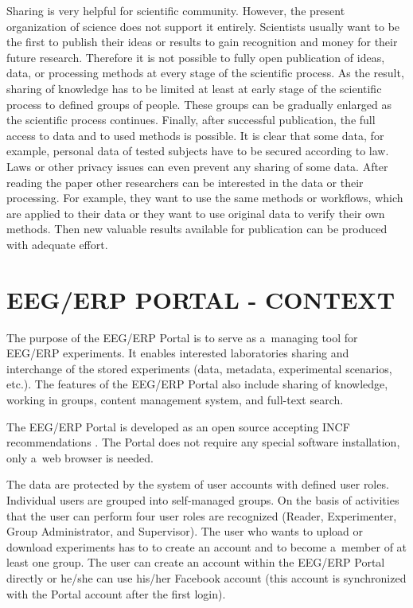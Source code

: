 \documentclass[a4paper,twoside]{article}
\begin{document}
Sharing is very helpful for scientific community.  However, the present organization of science does not support it entirely. Scientists usually want to be the first to publish their ideas or results to gain recognition and money for their future research. Therefore it is not possible to fully open publication of ideas, data, or processing methods at every stage of the scientific process. As the result, sharing of knowledge has to be limited at least at early stage of the scientific process to defined groups of people. These groups can be gradually enlarged as the scientific process continues. Finally, after successful publication, the full access to data and to used methods is possible. It is clear that some data, for example, personal data of tested subjects have to be secured according to law. Laws or other privacy issues can even prevent any sharing of some data. After reading the paper other researchers can be interested in the data or their processing. For example, they want to use the same methods or workflows, which are applied to their data or they want to use original data to verify their own methods. Then new valuable results available for publication can be produced with adequate effort.

\section{\label{EEG/ERP Portal}\uppercase{EEG/ERP Portal - Context}}

\noindent The purpose of the EEG/ERP Portal is to serve as a~managing tool for EEG/ERP experiments. It enables interested laboratories sharing and interchange of the stored experiments (data, metadata,  experimental scenarios, etc.). The features of the EEG/ERP Portal also include sharing of knowledge, working in groups, content management system, and full-text search.

The EEG/ERP Portal is developed as an open source accepting INCF recommendations \cite{incf-sustainability-report}. The Portal does not require any special software installation, only a~web browser is needed.

The data are protected by the system of user accounts with defined user roles. Individual users are grouped into self-managed groups. On the basis of activities that the user can perform four user roles are recognized (Reader, Experimenter, Group Administrator, and Supervisor). The user who wants to upload or download experiments has to to create an account and to become a~member of at least one group. The user can create an account within the EEG/ERP Portal directly or he/she can use his/her Facebook account (this account is synchronized with the Portal account after the first login).
\end{document}
